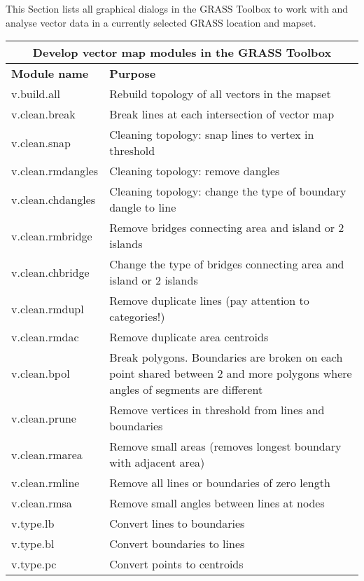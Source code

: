 This Section lists all graphical dialogs in the GRASS Toolbox to work with
and analyse vector data in a currently selected GRASS location and mapset.

{\footnotesize
\begin{table}[H]
\centering
 \begin{tabular}{|p{3cm}|p{11cm}|}
  \hline \multicolumn{2}{|c|}{\textbf{Develop vector map modules in the GRASS
  Toolbox}} \\
  \hline \textbf{Module name} & \textbf{Purpose} \\
  \hline v.build.all & Rebuild topology of all vectors in the mapset \\
  \hline v.clean.break & Break lines at each intersection of vector map \\
  \hline v.clean.snap & Cleaning topology: snap lines to vertex in threshold \\
  \hline v.clean.rmdangles & Cleaning topology: remove dangles \\
  \hline v.clean.chdangles & Cleaning topology: change the type of boundary
  dangle to line \\
  \hline v.clean.rmbridge & Remove bridges connecting area and island or 2
  islands \\
  \hline v.clean.chbridge & Change the type of bridges connecting area and
  island or 2 islands \\
  \hline v.clean.rmdupl & Remove duplicate lines (pay attention to
  categories!) \\
  \hline v.clean.rmdac & Remove duplicate area centroids \\
  \hline v.clean.bpol & Break polygons. Boundaries are broken on each
  point shared between 2 and more polygons where angles of segments are
  different \\
  \hline v.clean.prune & Remove vertices in threshold from lines and
  boundaries \\
  \hline v.clean.rmarea & Remove small areas (removes longest boundary with
  adjacent area) \\
  \hline v.clean.rmline & Remove all lines or boundaries of zero length \\
  \hline v.clean.rmsa & Remove small angles between lines at nodes \\
  \hline v.type.lb & Convert lines to boundaries \\
  \hline v.type.bl & Convert boundaries to lines \\
  \hline v.type.pc & Convert points to centroids \\

\end{tabular}
\end{table}}
